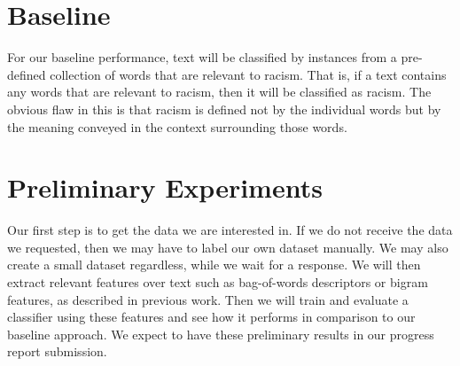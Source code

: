 \documentclass[]{article}
\begin{document}
\section{Baseline}

For our baseline performance, text will be classified by instances from a pre-defined collection of words that are relevant to racism. That is, if a text contains any words that are relevant to racism, then it will be classified as racism. The obvious flaw in this is that racism is defined not by the individual words but by the meaning conveyed in the context surrounding those words.

\section{Preliminary Experiments}

Our first step is to get the data we are interested in. If we do not receive the data we requested, then we may have to label our own dataset manually. We may also create a small dataset regardless, while we wait for a response. We will then extract relevant features over text such as bag-of-words descriptors or bigram features, as described in previous work. Then we will train and evaluate a classifier using these features and see how it performs in comparison to our baseline approach. We expect to have these preliminary results in our progress report submission.
\end{document}
